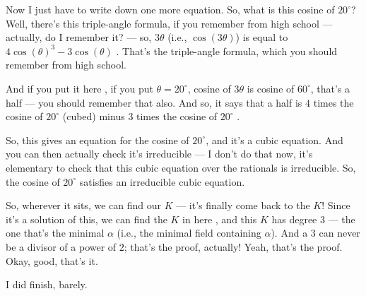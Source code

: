\begin{speech}[00:43:24 - 00:45:01]
Now I just have to write down one more equation. So, what is this cosine of $20^\circ$? Well, there's this triple-angle formula, if you remember from high school --- actually, do I remember it? --- so, $3\theta$ (i.e., $\cos(3\theta)$) is equal to $4 \cos(\theta)^3 - 3 \cos(\theta)$ . That's the triple-angle formula, which you should remember from high school.

And if you put it here , if you put $\theta = 20^\circ$, cosine of $3\theta$ is cosine of $60^\circ$, that's a half --- you should remember that also. And so, it says that a half is $4$ times the cosine of $20^\circ$ (cubed) minus $3$ times the cosine of $20^\circ$ .

So, this gives an equation for the cosine of $20^\circ$, and it's a cubic equation. And you can then actually check it's irreducible --- I don't do that now, it's elementary to check that this cubic equation over the rationals is irreducible. So, the cosine of $20^\circ$ satisfies an irreducible cubic equation.

So, wherever it sits, we can find our $K$ --- it's finally come back to the $K$! Since it's a solution of this, we can find the $K$ in here , and this $K$ has degree $3$ --- the one that's the minimal $\alpha$ (i.e., the minimal field containing $\alpha$). And a $3$ can never be a divisor of a power of $2$; that's the proof, actually! Yeah, that's the proof. Okay, good, that's it.

I did finish, barely.
\end{speech}

